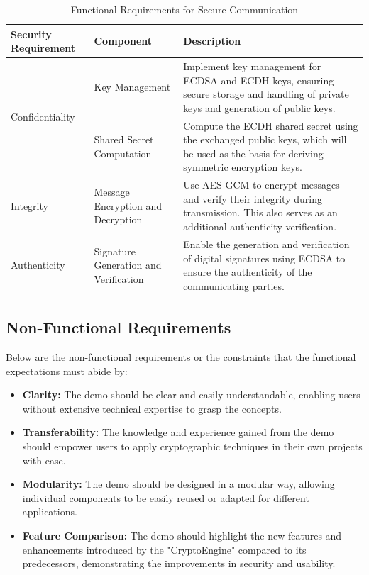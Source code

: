 \begin{table}[h]
\centering
\caption{Functional Requirements for Secure Communication}
\label{tab:functional_requirements}
\begin{tabular}{|m{2.5cm}|p{3.5cm}|p{9cm}|}
\hline
\textbf{Security Requirement} & \textbf{Component} & \textbf{Description} \\ \hline
\multirow{2}{*}{Confidentiality} & Key Management & Implement key management for ECDSA and ECDH keys, ensuring
secure storage and handling of private keys and generation of public keys. \\ \cline{2-3} 
 & Shared Secret Computation & Compute the ECDH shared secret using the exchanged public keys, which will be used as the basis for deriving symmetric encryption keys. \\ \hline
Integrity & Message Encryption and Decryption & Use AES GCM to encrypt messages and verify their integrity during transmission. This also serves as an additional authenticity verification. \\ \hline
Authenticity & Signature Generation and Verification & Enable the generation and verification of digital signatures using ECDSA to ensure the authenticity of the communicating parties. \\ \hline
\end{tabular}
\end{table}

\subsection{Non-Functional Requirements}
Below are the non-functional requirements or the constraints that the functional expectations must abide by:
\begin{itemize}
    \item \textbf{Clarity:} The demo should be clear and easily understandable, enabling users without extensive technical expertise to grasp the concepts.
     \item \textbf{Transferability:} The knowledge and experience gained from the demo should empower users to apply cryptographic techniques in their own projects with ease.
   \item \textbf{Modularity:} The demo should be designed in a modular way, allowing individual components to be easily reused or adapted for different applications.
  \item \textbf{Feature Comparison:} The demo should highlight the new features and enhancements introduced by the "CryptoEngine" compared to its predecessors, demonstrating the improvements in security and usability.
\end{itemize}

